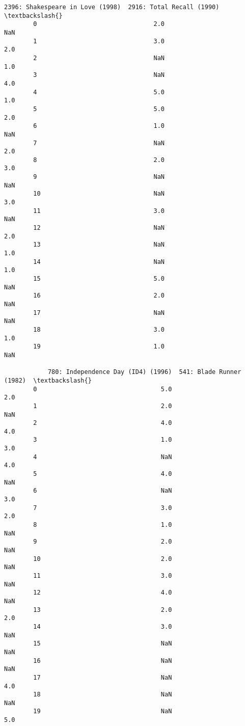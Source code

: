 \documentclass[11pt]{article}
\begin{document}
\begin{Verbatim}[commandchars=\\\{\}]
            2396: Shakespeare in Love (1998)  2916: Total Recall (1990)  \textbackslash{}
        0                                2.0                        NaN   
        1                                3.0                        2.0   
        2                                NaN                        1.0   
        3                                NaN                        4.0   
        4                                5.0                        1.0   
        5                                5.0                        2.0   
        6                                1.0                        NaN   
        7                                NaN                        2.0   
        8                                2.0                        3.0   
        9                                NaN                        NaN   
        10                               NaN                        3.0   
        11                               3.0                        NaN   
        12                               NaN                        2.0   
        13                               NaN                        1.0   
        14                               NaN                        1.0   
        15                               5.0                        NaN   
        16                               2.0                        NaN   
        17                               NaN                        NaN   
        18                               3.0                        1.0   
        19                               1.0                        NaN   
        
            780: Independence Day (ID4) (1996)  541: Blade Runner (1982)  \textbackslash{}
        0                                  5.0                       2.0   
        1                                  2.0                       NaN   
        2                                  4.0                       4.0   
        3                                  1.0                       3.0   
        4                                  NaN                       4.0   
        5                                  4.0                       NaN   
        6                                  NaN                       3.0   
        7                                  3.0                       2.0   
        8                                  1.0                       NaN   
        9                                  2.0                       NaN   
        10                                 2.0                       NaN   
        11                                 3.0                       NaN   
        12                                 4.0                       NaN   
        13                                 2.0                       2.0   
        14                                 3.0                       NaN   
        15                                 NaN                       NaN   
        16                                 NaN                       NaN   
        17                                 NaN                       4.0   
        18                                 NaN                       NaN   
        19                                 NaN                       5.0   
        

\end{Verbatim}
\end{document}
